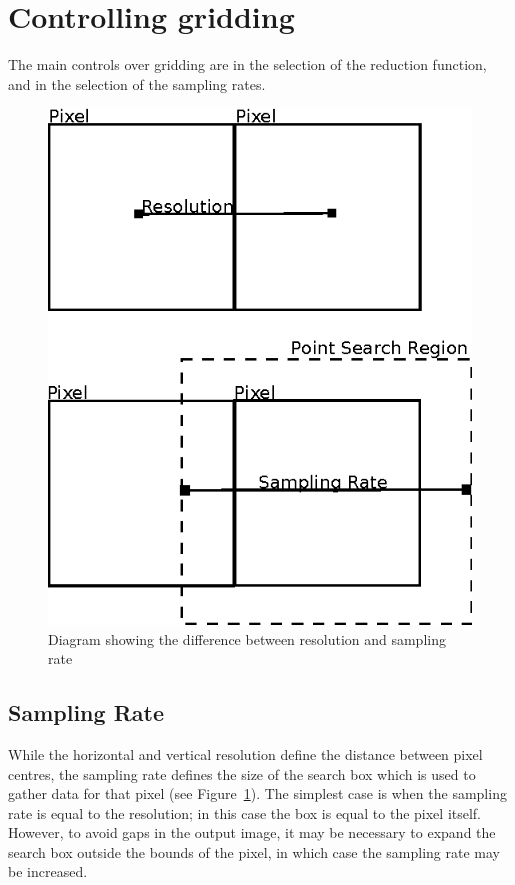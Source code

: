 \documentclass[a4paper,12pt]{article}
\begin{document}
\section{Controlling gridding}
The main controls over gridding are in the selection of the reduction function, and in the selection of the sampling rates.
\begin{figure}
\centering
\includegraphics{resolution_and_sampling.eps}
\caption{Diagram showing the difference between resolution and sampling rate}
\label{fig:res_and_sampling}
\end{figure}
\subsection{Sampling Rate}
While the horizontal and vertical resolution define the distance between pixel centres, the sampling rate defines the size of the search box which is used to gather data for that pixel (see Figure~\ref{fig:res_and_sampling}). The simplest case is when the sampling rate is equal to the resolution; in this case the box is equal to the pixel itself. However, to avoid gaps in the output image, it may be necessary to expand the search box outside the bounds of the pixel, in which case the sampling rate may be increased.
\end{document}
